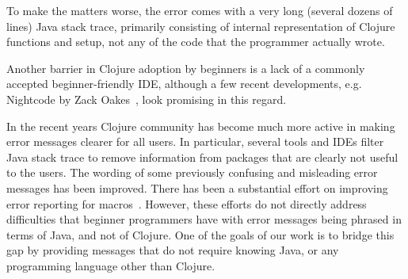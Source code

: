 \documentclass[submission,copyright,creativecommons]{eptcs}
\begin{document}
To make the matters worse, the error comes with a very long (several dozens of lines) Java stack trace, primarily consisting of internal 
representation of Clojure functions and setup, not any of the code that the programmer actually wrote. 

Another barrier in Clojure adoption by beginners is a lack of a commonly accepted beginner-friendly IDE, although
a few recent developments, e.g. Nightcode by Zack Oakes~\cite{nightcode},  look promising in this regard. 

In the recent years Clojure community has become much more active in making error messages clearer for all users. 
In particular, several tools and IDEs filter Java stack trace to remove information from packages that are clearly not useful to
the users. The wording of some previously confusing and misleading error messages has been improved. 
There has been a substantial effort on improving error reporting for macros~\cite{fleming}. 
However, these efforts do not directly address difficulties that beginner programmers 
have with error messages being phrased in terms of Java, and not of Clojure. One of the 
goals of our work is to bridge this gap by providing messages that do not require knowing
Java, or any programming language other than Clojure. 
\end{document}
